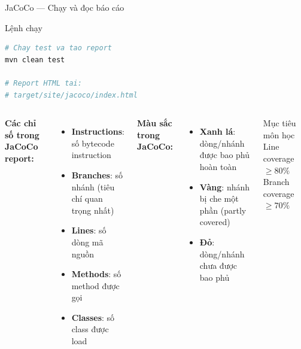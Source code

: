 \documentclass[aspectratio=169,12pt]{beamer}
\begin{document}
\begin{frame}[fragile,shrink=15]{JaCoCo --- Chạy và đọc báo cáo}
  \begin{block}{Lệnh chạy}
\begin{lstlisting}[language=bash,style=nonumber]
# Chay test va tao report
mvn clean test

# Report HTML tai:
# target/site/jacoco/index.html
\end{lstlisting}
  \end{block}

  \vspace{0.3em}
  \begin{columns}
    \textbf{Các chỉ số trong JaCoCo report:}
    \begin{itemize}
      \item \textbf{Instructions}: số bytecode instruction
      \item \textbf{Branches}: số nhánh (tiêu chí quan trọng nhất)
      \item \textbf{Lines}: số dòng mã nguồn
      \item \textbf{Methods}: số method được gọi
      \item \textbf{Classes}: số class được load
    \end{itemize}

    \textbf{Màu sắc trong JaCoCo:}
    \begin{itemize}
      \item \textbf{Xanh lá}: dòng/nhánh được bao phủ hoàn toàn
      \item \textbf{Vàng}: nhánh bị che một phần (partly covered)
      \item \textbf{Đỏ}: dòng/nhánh chưa được bao phủ
    \end{itemize}

    \vspace{0.3em}
    \begin{alertblock}{Mục tiêu môn học}
      Line coverage $\geq 80\%$\\
      Branch coverage $\geq 70\%$
    \end{alertblock}
  \end{columns}
\end{frame}
\end{document}
